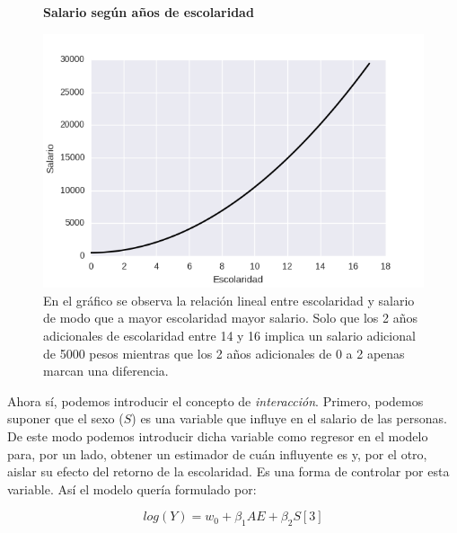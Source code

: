 \begin{figure}[h]
		\centering
		\textbf{Salario según años de escolaridad}\par\medskip
		\includegraphics[scale = 0.7]{../img/capitulo2/modelo2.png}
		\caption{En el gráfico se observa la relación lineal entre escolaridad y salario de modo que a mayor escolaridad mayor salario. Solo que los 2 años adicionales de escolaridad entre 14 y 16 implica un salario adicional de 5000 pesos mientras que los 2 años adicionales de 0 a 2 apenas marcan una diferencia.}
\end{figure}


Ahora sí, podemos introducir el concepto de \textit{interacción}. Primero, podemos suponer que el sexo ($S$) es una variable que influye en el salario de las personas. De este modo podemos introducir dicha variable como regresor en el modelo para, por un lado, obtener un estimador de cuán influyente es y, por el otro, aislar su efecto del retorno de la escolaridad. Es una forma de controlar por esta variable. Así el modelo quería formulado por:
 
$$log(Y) = w_0 + \beta_1 AE + \beta_2 S [3]$$

